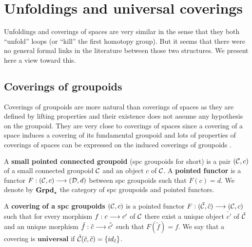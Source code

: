 


\section{Unfoldings and universal coverings}
\label{unicov}


Unfoldings and coverings of spaces \cite{may99} are very similar in the sense that they both ``unfold'' loops (or ``kill'' the first homotopy group). But it seems that there were no general formal links in the literature between those two structures. We present here a view toward this.



\subsection{Coverings of groupoids}
\label{groupoids}

Coverings of groupoids are more natural than coverings of spaces as they are defined by lifting properties and their existence does not assume any hypothesis on the groupoid. They are very close to coverings of spaces since a covering of a space induces a covering of its fundamental groupoid and lots of properties of coverings of spaces can be expressed on the induced coverings of groupoids \cite{may99}.

A \textbf{small pointed connected groupoid} (spc groupoids for short) is a pair $(\mathcal{C},c)$ of a small connected groupoid $\mathcal{C}$ and an object $c$ of $\mathcal{C}$. A \textbf{pointed functor} is a functor $F : (\mathcal{C},c) \longrightarrow (\mathcal{D},d)$ between spc groupoids such that $F(c) = d$. We denote by $\textbf{Grpd}_\star$ the category of spc groupoids and pointed functors.

A \textbf{covering of a spc groupoids $(\mathcal{C},c)$} is a pointed functor $F : (\tilde{\mathcal{C}},\tilde{c}) \longrightarrow (\mathcal{C},c)$ such that for every morphism $f : c \longrightarrow c'$ of $\mathcal{C}$ there exist a unique object $\tilde{c'}$ of $\tilde{\mathcal{C}}$ and an unique morphism $\tilde{f} : \tilde{c} \longrightarrow \tilde{c'}$ such that $F(\tilde{f}) = f$. We say that a covering is $\textbf{universal}$ if $\tilde{\mathcal{C}}(\tilde{c},\tilde{c}) = \{id_{\tilde{c}}\}$.

